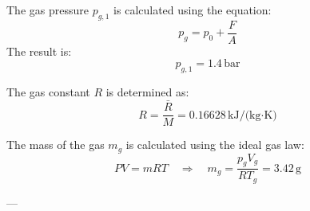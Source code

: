 The gas pressure \( p_{g,1} \) is calculated using the equation:  
\[
p_g = p_0 + \frac{F}{A}
\]  
The result is:  
\[
p_{g,1} = 1.4 \, \text{bar}
\]  

The gas constant \( R \) is determined as:  
\[
R = \frac{\bar{R}}{M} = 0.16628 \, \text{kJ/(kg·K)}
\]  

The mass of the gas \( m_g \) is calculated using the ideal gas law:  
\[
PV = mRT \quad \Rightarrow \quad m_g = \frac{p_g V_g}{R T_g} = 3.42 \, \text{g}
\]  

---
